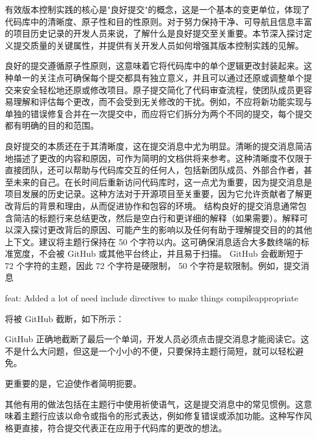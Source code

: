 
有效版本控制实践的核心是"良好提交"的概念，这是一个基本的变更单位，体现了代码库中的清晰度、原子性和目的性原则。对于努力保持干净、可导航且信息丰富的项目历史记录的开发人员来说，了解什么是良好提交至关重要。本节深入探讨定义提交质量的关键属性，并提供有关开发人员如何增强其版本控制实践的见解。


良好的提交遵循原子性原则，这意味着它将代码库中的单个逻辑更改封装起来。这种单一的关注点可确保每个提交都具有独立意义，并且可以通过还原或调整单个提交来安全轻松地还原或修改项目。原子提交简化了代码审查流程，使团队成员更容易理解和评估每个更改，而不会受到无关修改的干扰。例如，不应将新功能实现与单独的错误修复合并在一次提交中，而应将它们拆分为两个不同的提交，每个提交都有明确的目的和范围。


良好提交的本质还在于其清晰度，这在提交消息中尤为明显。清晰的提交消息简洁地描述了更改的内容和原因，可作为简明的文档供将来参考。这种清晰度不仅限于直接团队，还可以帮助与代码库交互的任何人，包括新团队成员、外部合作者，甚至未来的自己。在长时间后重新访问代码库时，这一点尤为重要，因为提交消息是项目发展的历史记录。这种方法对于开源项目至关重要，因为它允许贡献者了解更改背后的背景和理由，从而促进协作和包容的环境。
结构良好的提交消息通常包含简洁的标题行来总结更改，然后是空白行和更详细的解释（如果需要）。解释可以深入探讨更改背后的原因、可能产生的影响以及任何有助于理解提交目的的其他上下文。建议将主题行保持在 50 个字符以内。这可确保消息适合大多数终端的标准宽度，不会被 GitHub 或其他平台终止，并且易于扫描。 GitHub 会截断短于 72 个字符的主题，因此 72 个字符是硬限制， 50 个字符是软限制。例如，提交消息

\begin{shell}
feat: Added a lot of need include directives to make things compileappropriate
\end{shell}

将被 GitHub 截断，如下所示：


GitHub 正确地截断了最后一个单词，开发人员必须点击提交消息才能阅读它。这不是什么大问题，但这是一个小小的不便，只要保持主题行简短，就可以轻松避免。

更重要的是，它迫使作者简明扼要。

其他有用的做法包括在主题行中使用祈使语气，这是提交消息中的常见惯例。这意味着主题行应该以命令或指令的形式表达，例如修复错误或添加功能。这种写作风格更直接，符合提交代表正在应用于代码库的更改的想法。

